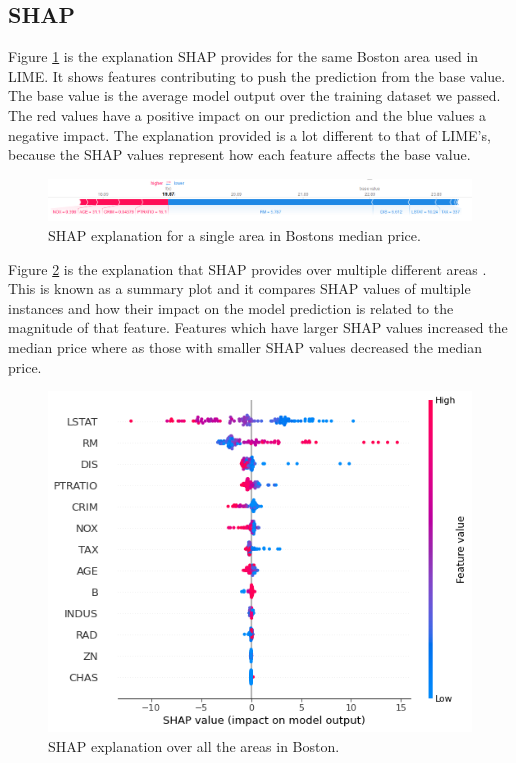 \subsection{SHAP}
Figure \ref{fig:shap-house-single} is the explanation SHAP provides for the same Boston area used in LIME. It shows features contributing to push the prediction from the base value. The base value is the average model output over the training dataset we passed. The red values have a positive impact on our prediction and the blue values a negative impact. The explanation provided is a lot different to that of LIME's, because the SHAP values represent how each feature affects the base value.
\begin  {figure}[!htpb]
  \includegraphics[width=\linewidth]{Evaluation_Images/house_indv_shap.png}
  \caption{SHAP explanation for a single area in Bostons median price.}
  \label{fig:shap-house-single}
\end{figure}
Figure \ref{fig:shap-house-entire} is the explanation that SHAP provides over multiple different areas . This is known as a summary plot and it compares SHAP values of multiple instances and how their impact on the model prediction is related to the magnitude of that feature. Features which have larger SHAP values increased the median price where as those with smaller SHAP values decreased the median price.
\begin  {figure}[!htpb]
  \includegraphics[width=\linewidth]{Evaluation_Images/house_shap.png}
  \caption{SHAP explanation over all the areas in Boston.}
  \label{fig:shap-house-entire}
\end{figure}
